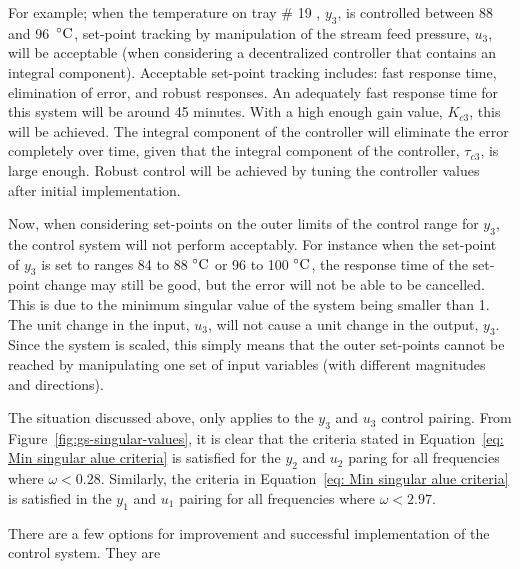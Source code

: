 For example; when the temperature on tray \# 19 , $y_3$, is controlled between 88 and 96~$\celsius$, set-point tracking by manipulation of the stream feed pressure, $u_3$, will be acceptable (when considering a decentralized controller that contains an integral component). Acceptable set-point tracking includes: fast response time, elimination of error, and robust responses. An adequately fast response time for this system will be around 45 minutes. With a high enough gain value, $K_{c3}$, this will be achieved. The integral component of the controller will eliminate the error completely over time, given that the integral component of the controller, $\tau_{c3}$, is large enough. Robust control will be achieved by tuning the controller values after initial implementation.

Now, when considering set-points on the outer limits of the control range for $y_3$, the control system will not perform acceptably. For instance when the set-point of $y_3$ is set to ranges 84 to 88 $\celsius$ or 96 to 100 $\celsius$, the response time of the set-point change may still be good, but the error will not be able to be cancelled. This is due to the minimum singular value of the system being smaller than 1. The unit change in the input, $u_3$, will not cause a unit change in the output, $y_3$. Since the system is scaled, this simply means that the outer set-points cannot be reached by manipulating one set of input variables (with different magnitudes and directions). 

The situation discussed above, only applies to the $y_3$ and $u_3$ control pairing. From Figure~\ref{fig:gs-singular-values}, it is clear that the criteria stated in Equation~\ref{eq: Min singular alue criteria} is satisfied for the $y_2$ and $u_2$ paring for all frequencies where $\omega<0.28$. Similarly, the criteria in Equation~\ref{eq: Min singular alue criteria} is satisfied in the $y_1$ and $u_1$ pairing for all frequencies where $\omega < 2.97$.

There are a few options for improvement and successful implementation of the control system. They are

